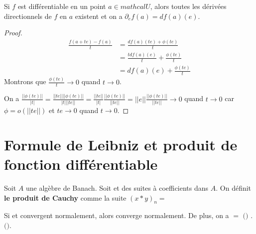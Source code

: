 \begin{proposition}
	Si $f$ est différentiable en un point $a \in mathcal{U}$, alors toutes les
	dérivées directionnels de $f$ en $a$ existent et on a $\partial_{e}f(a) =
	df(a)(e)$.
\end{proposition}

\begin{proof}
\begin{align}
	\displaystyle \frac{f(a + te) - f(a)}{t} 
	&= \frac{df(a)(te) + \phi(te)}{t}\\
	&= \frac{t df(a)(e)}{t} + \frac{\phi(te)}{t} \\
	&= df(a)(e) + \frac{\phi(te)}{t}
\end{align}
	Montrons que $\displaystyle \frac{\phi(te)}{t} \rightarrow 0$ quand $t
	\rightarrow 0$.

	On a $\displaystyle \frac{||\phi(te)||}{|t|} = \frac{||te||
	||\phi(te)||}{|t| ||te||} = \frac{||te||}{|t|}
	\frac{||\phi(te)||}{||te||} = ||e|| \frac{||\phi(te)||}{||te||} \rightarrow
	0$ quand $t \rightarrow 0$ car $\phi = o(||te||)$ et $te \rightarrow 0$
	quand $t \rightarrow 0$.
\end{proof}

\begin{definition}
\label{partial_application_definition}
	

\end{definition}

\section{Formule de Leibniz et produit de fonction différentiable}

\begin{definition}
	Soit $A$ une algèbre de Banach. Soit  et
	 des suites à coefficients dans $A$.
	On définit \textbf{le produit de Cauchy} comme la suite ${(x \ast y)}_{n} =
	$
\end{definition}

\begin{theorem}
\label{theorem_cauchy_mertens}
Si  et  convergent
normalement, alors  converge normalement.
De plus, on a  $ = $
$($$)$ . $($$)$.
\end{theorem}

